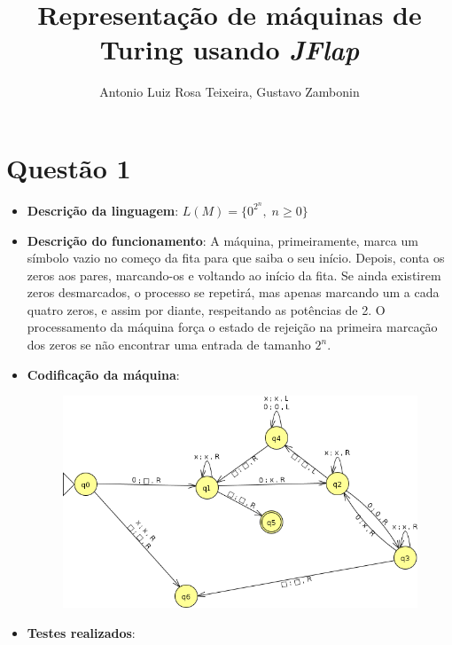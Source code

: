 \documentclass{../sftex/sftex}
\title{Representação de máquinas de Turing usando \emph{JFlap}}
\author{Antonio Luiz Rosa Teixeira, Gustavo Zambonin}
\begin{document}
\maketitle

\section*{Questão 1}

\begin{itemize}

    \item \textbf{Descrição da linguagem}: $L(M) = \{0^{2^{n}}, \; n \geq 0\}$

    \item \textbf{Descrição do funcionamento}: A máquina, primeiramente,
        marca um símbolo vazio no começo da fita para que saiba o seu início.
        Depois, conta os zeros aos pares, marcando-os e voltando ao início da
        fita. Se ainda existirem zeros desmarcados, o processo se repetirá,
        mas apenas marcando um a cada quatro zeros, e assim por diante,
        respeitando as potências de 2. O processamento da máquina força o
        estado de rejeição na primeira marcação dos zeros se não encontrar uma
        entrada de tamanho $2^{n}$.

    \item \textbf{Codificação da máquina}:

        \begin{figure}[htbp]
            \centering
            \includegraphics[scale=0.5]{images/questao1_ss.png}
        \end{figure}

    \item \textbf{Testes realizados}:


\end{itemize}
\end{document}
